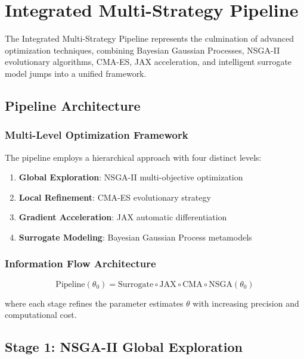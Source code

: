 \section{Integrated Multi-Strategy Pipeline}
\label{sec:pipeline_integration}

The Integrated Multi-Strategy Pipeline represents the culmination of advanced optimization techniques, combining Bayesian Gaussian Processes, NSGA-II evolutionary algorithms, CMA-ES, JAX acceleration, and intelligent surrogate model jumps into a unified framework.

\subsection{Pipeline Architecture}

\subsubsection{Multi-Level Optimization Framework}

The pipeline employs a hierarchical approach with four distinct levels:

\begin{enumerate}
\item \textbf{Global Exploration}: NSGA-II multi-objective optimization
\item \textbf{Local Refinement}: CMA-ES evolutionary strategy  
\item \textbf{Gradient Acceleration}: JAX automatic differentiation
\item \textbf{Surrogate Modeling}: Bayesian Gaussian Process metamodels
\end{enumerate}

\subsubsection{Information Flow Architecture}

\begin{equation}
\text{Pipeline}(\theta_0) = \text{Surrogate} \circ \text{JAX} \circ \text{CMA} \circ \text{NSGA}(\theta_0)
\end{equation}

where each stage refines the parameter estimates $\theta$ with increasing precision and computational cost.

\subsection{Stage 1: NSGA-II Global Exploration}

